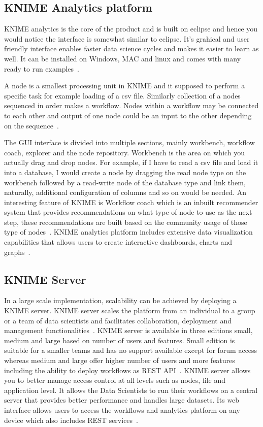 \subsection{KNIME Analytics platform}
KNIME analytics is the core of the product and is built on eclipse and
hence you would notice the interface is somewhat similar to
eclipse. It's grahical and user friendly interface enables faster data
science cycles and makes it easier to learn as well. It can be
installed on Windows, MAC and linux and comes with many ready to run
examples~\cite{hid-sp18-517-kap}.

A node is a smallest processing unit in KNIME and it supposed to
perform a specific task for example loading of a csv file. Similarly
collection of a nodes sequenced in order makes a workflow. Nodes
within a workflow may be connected to each other and output of one
node could be an input to the other depending on the
sequence~\cite{hid-sp18-517-kintro}.

The GUI interface is divided into multiple sections, mainly workbench,
workflow coach, explorer and the node repository. Workbench is the
area on which you actually drag and drop nodes. For example, if I have
to read a csv file and load it into a database, I would create a node
by dragging the read node type on the workbench followed by a
read-write node of the database type and link them, naturally,
additional configuration of columns and so on would be needed.  An
interesting feature of KNIME is Workflow coach which is an inbuilt
recommender system that provides recommendations on what type of node
to use as the next step, these recommendations are built based on the
community usage of those type of nodes~\cite{hid-sp18-517-ch1sec1}.
KNIME analytics platform includes extensive data visualization
capabilities that allows users to create interactive dashboards,
charts and graphs~\cite{hid-sp18-517-ch5}.

\subsection{KNIME Server}
In a large scale implementation, scalability can be achieved by
deploying a KNIME server. KNIME server scales the platform from an
individual to a group or a team of data scientists and facilitates
collaboration, deployment and management
functionalities~\cite{hid-sp18-517-server}. KNIME server is available
in three editions small, medium and large based on number of users and
features. Small edition is suitable for a smaller teams and has no
support available except for forum access whereas medium and large
offer higher number of users and more features including the ability
to deploy workflows as REST API~\cite{hid-sp18-517-editions}.  KNIME
server allows you to better manage access control at all levels such
as nodes, file and application level. It allows the Data Scientists to
run their workflows on a central server that provides better
performance and handles large datasets. Its web interface allows users
to access the workflows and analytics platform on any device which
also includes REST services~\cite{hid-sp18-517-editions}.

